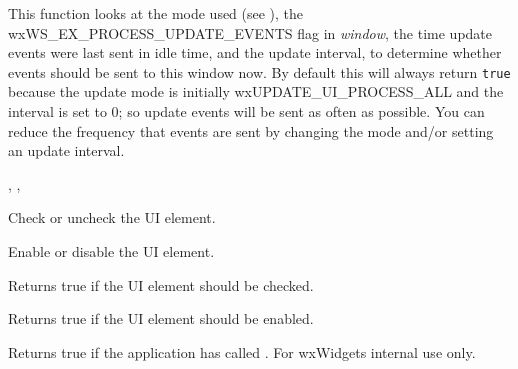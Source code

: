 This function looks at the mode used (see ),
the wxWS\_EX\_PROCESS\_UPDATE\_EVENTS flag in {\it window},
the time update events were last sent in idle time, and
the update interval, to determine whether events should be sent to
this window now. By default this will always return {\tt true} because
the update mode is initially wxUPDATE\_UI\_PROCESS\_ALL and
the interval is set to 0; so update events will be sent as
often as possible. You can reduce the frequency that events
are sent by changing the mode and/or setting an update interval.


, 
, 

\label{wxupdateuieventcheck}


Check or uncheck the UI element.

\label{wxupdateuieventenable}


Enable or disable the UI element.

\label{wxupdateuieventgetchecked}


Returns true if the UI element should be checked.

\label{wxupdateuieventgetenabled}


Returns true if the UI element should be enabled.

\label{wxupdateuieventgetsetchecked}


Returns true if the application has called . For wxWidgets internal use only.

\label{wxupdateuieventgetsetenabled}


